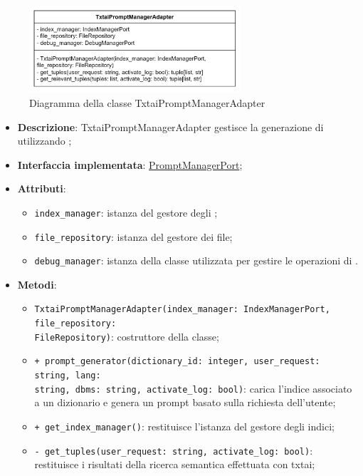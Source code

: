  \label{TxtaiPromptManagerAdapter}
\begin{figure}[H]
    \centering
    \includegraphics[width=0.7\textwidth]{assets/Backend/txtai_prompt_manager_adapter.png}
    \caption{Diagramma della classe TxtaiPromptManagerAdapter}
  \end{figure}
\begin{itemize}
    \item \textbf{Descrizione}: TxtaiPromptManagerAdapter gestisce la generazione di  utilizzando ;
    \item \textbf{Interfaccia implementata}: \hyperref[PromptManagerPort]{PromptManagerPort};
    \item \textbf{Attributi}:
    \begin{itemize}
        \item \texttt{index\_manager}: istanza del gestore degli ;
        \item \texttt{file\_repository}: istanza del gestore dei file;
        \item \texttt{debug\_manager}: istanza della classe utilizzata per gestire le operazioni di .
    \end{itemize}
    \item \textbf{Metodi}:
    \begin{itemize}
        \item \texttt{TxtaiPromptManagerAdapter(index\_manager: IndexManagerPort, file\_repository:\\ FileRepository)}: costruttore della classe;
        \item \texttt{+ prompt\_generator(dictionary\_id: integer, user\_request: string, lang:\\ string, dbms: string, activate\_log: bool)}: carica l'indice associato a un dizionario e genera un prompt basato sulla richiesta dell'utente;
        \item \texttt{+ get\_index\_manager()}: restituisce l'istanza del gestore degli indici;
        \item \texttt{- get\_tuples(user\_request: string, activate\_log: bool)}: restituisce i risultati della ricerca semantica effettuata con txtai;

\end{itemize}
\end{itemize}
